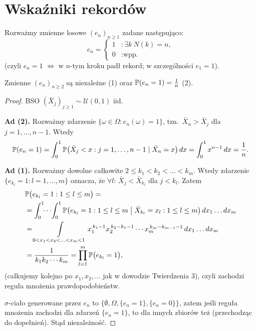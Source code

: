 \documentclass[dvipsnames]{book}
\begin{document}
\hrulefill

\section*{Wskaźniki rekordów}

Rozważmy zmienne losowe $(e_n)_{n \geq 1}$ zadane następująco:
\[
  e_n = \begin{cases}
    1 & : \exists k\ N(k) = n, \\
    0 & : \text{wpp.}
  \end{cases}
\]
(czyli $e_n = 1$ $\iff$ w $n$-tym kroku padł rekord; w szczególności $e_1 = 1$).

\begin{lematbox}
Zmienne $(e_n)_{n \geq 2}$ są niezależne \textup{(1)} oraz
$\P(e_n = 1) = \frac{1}{n}$ \textup{(2)}.
\end{lematbox}

\begin{proof}
BSO $(\bar X_j)_{j \geq 1} \sim \mathcal{U}(0,1)$ iid.

\textbf{Ad (2).} Rozważmy zdarzenie $\{\omega \in \Omega : e_n(\omega) = 1\}$,
tzn.\ $\bar X_n > \bar X_j$ dla $j = 1, \ldots, n-1$. Wtedy
\[
  \P(e_n = 1)
  = \int_0^1 \P\big(\bar X_j < x : j = 1, \ldots, n-1 \mid \bar X_n = x\big)\, dx
  = \int_0^1 x^{n-1}\, dx = \frac{1}{n}.
\]

\textbf{Ad (1).} Rozważmy dowolne całkowite $2 \leq k_1 < k_2 < \ldots < k_m$.
Wtedy zdarzenie $\{e_{k_l} = 1 : l = 1, \ldots, m\}$ oznacza, że
$\forall l$: $\bar X_j < \bar X_{k_l}$ dla $j < k_l$. Zatem
\begin{align*}
  &\P\big(e_{k_l} = 1 : 1 \leq l \leq m\big) = \\
  &= \int_0^1 \!\!\cdots\! \int_0^1
    \P\big(e_{k_l} = 1 : 1 \leq l \leq m \;\big|\;
    \bar X_{k_l} = x_l : 1 \leq l \leq m\big)\, dx_1 \ldots dx_m \\
  &= \int\limits_{0 < x_1 < x_2 < \ldots < x_m < 1}
    x_1^{\,k_1 - 1} x_2^{\,k_2 - k_1 - 1} \cdots x_m^{\,k_m - k_{m-1} - 1}\,
    dx_1 \ldots dx_m \\
  &= \frac{1}{k_1 k_2 \cdots k_m}
   = \prod_{l=1}^{m} \P\big(e_{k_l} = 1\big),
\end{align*}
(całkujemy kolejno po $x_1, x_2, \ldots$ jak w dowodzie Twierdzenia 3), czyli
zachodzi reguła mnożenia prawdopodobieństw.

$\sigma$-ciało generowane przez $e_n$ to
$\{\emptyset, \Omega, \{e_n = 1\}, \{e_n = 0\}\}$, zatem jeśli reguła mnożenia
zachodzi dla zdarzeń $\{e_n = 1\}$, to dla innych zbiorów też (przechodząc do
dopełnień). Stąd niezależność.
\end{proof}
\end{document}
